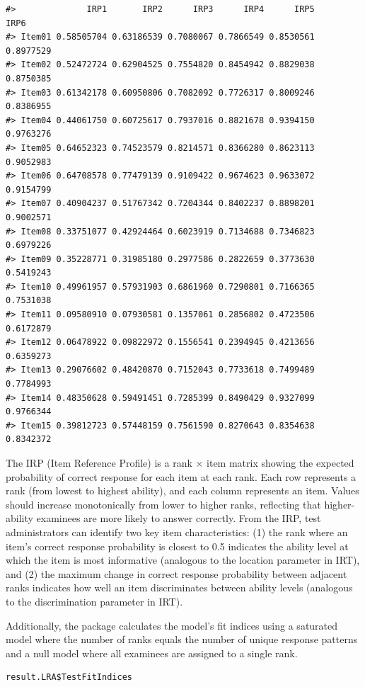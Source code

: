 \begin{verbatim}
#>              IRP1       IRP2      IRP3      IRP4      IRP5      IRP6
#> Item01 0.58505704 0.63186539 0.7080067 0.7866549 0.8530561 0.8977529
#> Item02 0.52472724 0.62904525 0.7554820 0.8454942 0.8829038 0.8750385
#> Item03 0.61342178 0.60950806 0.7082092 0.7726317 0.8009246 0.8386955
#> Item04 0.44061750 0.60725617 0.7937016 0.8821678 0.9394150 0.9763276
#> Item05 0.64652323 0.74523579 0.8214571 0.8366280 0.8623113 0.9052983
#> Item06 0.64708578 0.77479139 0.9109422 0.9674623 0.9633072 0.9154799
#> Item07 0.40904237 0.51767342 0.7204344 0.8402237 0.8898201 0.9002571
#> Item08 0.33751077 0.42924464 0.6023919 0.7134688 0.7346823 0.6979226
#> Item09 0.35228771 0.31985180 0.2977586 0.2822659 0.3773630 0.5419243
#> Item10 0.49961957 0.57931903 0.6861960 0.7290801 0.7166365 0.7531038
#> Item11 0.09580910 0.07930581 0.1357061 0.2856802 0.4723506 0.6172879
#> Item12 0.06478922 0.09822972 0.1556541 0.2394945 0.4213656 0.6359273
#> Item13 0.29076602 0.48420870 0.7152043 0.7733618 0.7499489 0.7784993
#> Item14 0.48350628 0.59491451 0.7285399 0.8490429 0.9327099 0.9766344
#> Item15 0.39812723 0.57448159 0.7561590 0.8270643 0.8354638 0.8342372
\end{verbatim}

The IRP (Item Reference Profile) is a rank \(\times\) item matrix showing the expected probability of correct response for each item at each rank. Each row represents a rank (from lowest to highest ability), and each column represents an item. Values should increase monotonically from lower to higher ranks, reflecting that higher-ability examinees are more likely to answer correctly. From the IRP, test administrators can identify two key item characteristics: (1) the rank where an item's correct response probability is closest to 0.5 indicates the ability level at which the item is most informative (analogous to the location parameter in IRT), and (2) the maximum change in correct response probability between adjacent ranks indicates how well an item discriminates between ability levels (analogous to the discrimination parameter in IRT).

Additionally, the package calculates the model's fit indices using a saturated model where the number of ranks equals the number of unique response patterns and a null model where all examinees are assigned to a single rank.

\begin{verbatim}
result.LRA$TestFitIndices
\end{verbatim}

